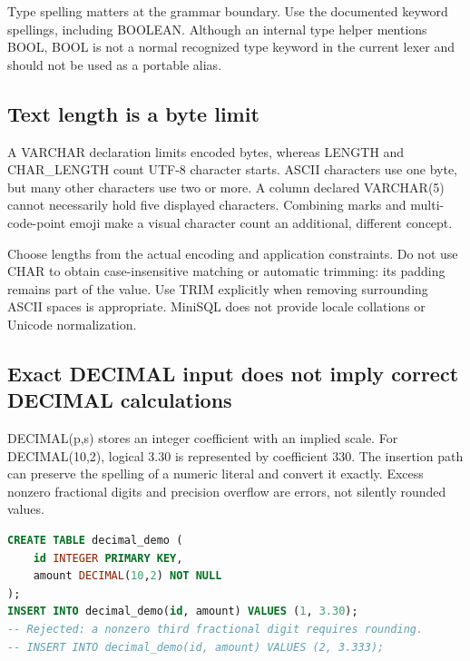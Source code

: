 Type spelling matters at the grammar boundary. Use the documented keyword spellings, including BOOLEAN. Although an internal type helper mentions BOOL, BOOL is not a normal recognized type keyword in the current lexer and should not be used as a portable alias.

\subsection{Text length is a byte limit}

A VARCHAR declaration limits encoded bytes, whereas LENGTH and CHAR\_LENGTH count UTF-8 character starts. ASCII characters use one byte, but many other characters use two or more. A column declared VARCHAR(5) cannot necessarily hold five displayed characters. Combining marks and multi-code-point emoji make a visual character count an additional, different concept.

Choose lengths from the actual encoding and application constraints. Do not use CHAR to obtain case-insensitive matching or automatic trimming: its padding remains part of the value. Use TRIM explicitly when removing surrounding ASCII spaces is appropriate. MiniSQL does not provide locale collations or Unicode normalization.

\subsection{Exact DECIMAL input does not imply correct DECIMAL calculations}
\label{sql:decimal-caveat}

DECIMAL(p,s) stores an integer coefficient with an implied scale. For DECIMAL(10,2), logical 3.30 is represented by coefficient 330. The insertion path can preserve the spelling of a numeric literal and convert it exactly. Excess nonzero fractional digits and precision overflow are errors, not silently rounded values.

\begin{lstlisting}[language=SQL]
CREATE TABLE decimal_demo (
    id INTEGER PRIMARY KEY,
    amount DECIMAL(10,2) NOT NULL
);
INSERT INTO decimal_demo(id, amount) VALUES (1, 3.30);
-- Rejected: a nonzero third fractional digit requires rounding.
-- INSERT INTO decimal_demo(id, amount) VALUES (2, 3.333);
\end{lstlisting}


